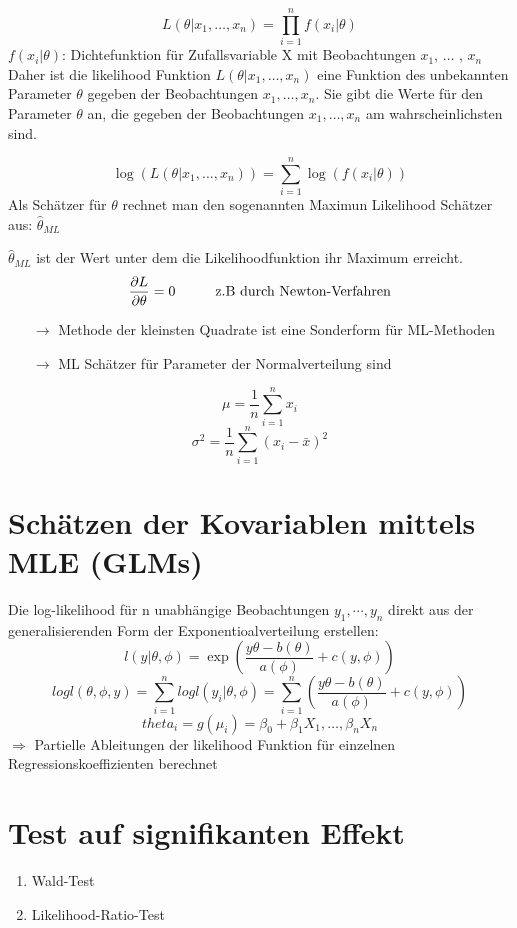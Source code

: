 \documentclass[10pt]{report}
\theoremstyle{definition}
\begin{document}
\[
L(\theta|x_1, \ldots, x_n)  = \prod_{i=1}^{n} f(x_i|\theta)
\]
$f(x_i|\theta)$: Dichtefunktion für Zufallsvariable X mit Beobachtungen $x_1$, $\ldots$ , $x_n$\\

Daher ist die likelihood Funktion  $L(\theta|x_1, \ldots, x_n)$ eine Funktion des unbekannten Parameter $\theta$ gegeben der Beobachtungen $x_1, \ldots, x_n$. Sie gibt die Werte für den Parameter $\theta$ an, die gegeben der Beobachtungen $x_1,\ldots, x_n$ am wahrscheinlichsten sind.

\[
\log (L(\theta|x_1, \ldots, x_n))  = \sum_{i=1}^{n} \log(f(x_i|\theta))
\]
Als Schätzer für $\theta$ rechnet man den sogenannten Maximun Likelihood Schätzer aus: $\hat{\theta}_{ML}$

$\hat{\theta}_{ML}$ ist der Wert unter dem die Likelihoodfunktion ihr Maximum erreicht.
\[
\frac{\partial L}{\partial \theta} = 0 \text{\tab z.B durch Newton-Verfahren}
\]


\begin{itemize}
	\item[$\rightarrow$] Methode der kleinsten Quadrate ist eine Sonderform für ML-Methoden
	\item[$\rightarrow$] ML Schätzer für Parameter der Normalverteilung sind 
\end{itemize}


\[\mu = \frac{1}{n} \sum_{i = 1}^{n} x_i \]
\[\sigma^2 = \frac{1}{n} \sum_{i = 1}^{n}(x_i - \bar{x})^2\]

\section{Schätzen der Kovariablen mittels MLE (GLMs)}
Die log-likelihood für n unabhängige Beobachtungen $y_1,\cdots,y_n$ direkt aus der generalisierenden Form der Exponentioalverteilung erstellen:
\[ l(y|\theta, \phi) = \exp \left( \frac{y \theta - b(\theta)}{a(\phi)} + c(y,\phi) \right) \]
\[ log l (\theta, \phi, y) = \sum\limits_{i=1}^{n} log l (y_i | \theta, \phi) = \sum\limits_{i=1}^{n} \left( \frac{y \theta - b(\theta)}{a(\phi)} + c(y,\phi) \right) \]
\[theta_i = g(\mu_i)=\beta_0 + \beta_1 X_1,\dots,\beta_n X_n \]
$\Rightarrow$ Partielle Ableitungen der likelihood Funktion für einzelnen Regressionskoeffizienten berechnet
\section{Test auf signifikanten Effekt}
\begin{enumerate}
	\item Wald-Test
	\item Likelihood-Ratio-Test
\end{enumerate}
\end{document}
